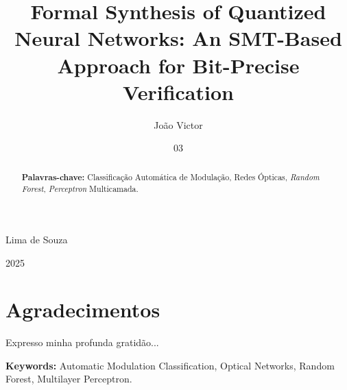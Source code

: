   \title{Formal Synthesis of Quantized Neural Networks: An SMT-Based Approach for Bit-Precise Verification}
  
  
  \author{João Victor}{Lima de Souza}
  
  \date{03}{2025}


\maketitle

\frontmatter

\thispagestyle{empty}

\dedication{Gostaria de expressar minha gratidão...}

\chapter*{Agradecimentos}
Expresso minha profunda gratidão...

\begin{abstract}


\textbf{Palavras-chave:} Classificação Automática de Modulação, Redes Ópticas, \textit{Random Forest}, \textit{Perceptron} Multicamada.
\end{abstract}

\begin{foreignabstract}


\textbf{Keywords:} Automatic Modulation Classification, Optical Networks, Random Forest, Multilayer Perceptron.
\end{foreignabstract}
   \pagestyle{plain}
   \lhead[\fancyplain{}{\bfseries\tiny\thepage}]{\fancyplain{}{\bfseries\tiny\rightmark}}
   \rhead[\fancyplain{}{\bfseries\tiny\leftmark}]{}

  \tableofcontents
  \listoffigures
  \listoftables